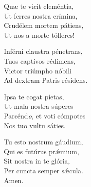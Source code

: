 Quæ te vicit cleméntia,\\
Ut ferres nostra crímina,\\
Crudélem mortem pátiens,\\
Ut nos a morte tólleres!

Inférni claustra pénetrans,\\
Tuos captívos rédimens,\\
Victor triúmpho nóbili\\
Ad dextram Patris résidens.

Ipsa te cogat píetas,\\
Ut mala nostra súperes\\
Parcénd\textit{o,} et voti cómpotes\\
Nos tuo vultu sáties.

Tu esto nostrum gáudium,\\
Qui es futúrus prǽmium,\\
Sit nostra in te glória,\\
Per cun\-cta semper sǽcula.\\
Amen.